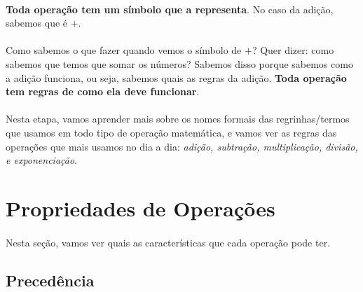 \documentclass[12pt]{article}
\begin{document}
\paragraph{}
\textbf{Toda operação tem um símbolo que a representa}. 
No caso da adição, sabemos que é $+$.
\paragraph{}
Como sabemos o que fazer quando vemos o símbolo de $+$? Quer dizer: como 
sabemos que temos que somar os números? Sabemos disso porque sabemos como a
adição funciona, ou seja, sabemos quais as regras da adição. 
\textbf{Toda operação tem regras de como ela deve funcionar}.
\paragraph{}
Nesta etapa, vamos aprender mais sobre os nomes formais das regrinhas/termos que 
usamos em todo tipo de operação matemática, e vamos ver as regras das operações
que mais usamos no dia a dia: \textit{adição, subtração, multiplicação, divisão,
e exponenciação}.

\section{Propriedades de Operações}
\paragraph{}
Nesta seção, vamos ver quais as características que cada operação pode ter.

\subsection{Precedência}
\end{document}
